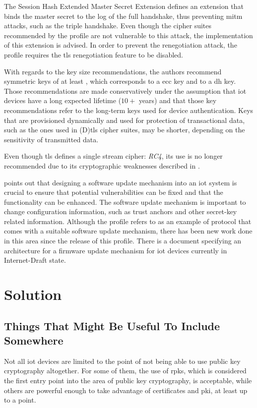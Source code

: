 \documentclass{llncs}
\begin{document}
The Session Hash Extended Master Secret Extension\cite{RFC7627} defines an extension
that binds the master secret to the log of the full handshake, thus preventing
\gls{mitm} attacks, such as the triple handshake\cite{TripleHa89:online}. Even though the
cipher suites recommended by the profile are not vulnerable to this attack, the
implementation of this extension is advised. In order to prevent the renegotiation
attack\cite{RFC5746}, the profile requires the \gls{tls} renegotiation feature
to be disabled.

With regards to the key size recommendations, the authors recommend symmetric keys
of at least , which corresponds to a  \gls{ecc}
key and to a  \gls{dh} key. Those recommendations are made
conservatively under the assumption that \gls{iot} devices have a long expected
lifetime ($10+$ years) and that those key recommendations refer to the long-term
keys used for device authentication. Keys that are provisioned dynamically
and used for protection of transactional data, such as the ones used in
(D)\gls{tls} cipher suites, may be shorter, depending on the sensitivity of
transmitted data.

Even though \gls{tls} defines a single stream cipher: \textit{RC4}, its use is no longer
recommended due to its cryptographic weaknesses described in \cite{RFC7465}.

\cite{RFC7925} points out that designing a software
update mechanism into an \gls{iot} system is crucial to ensure that potential vulnerabilities
can be fixed and that the functionality can be enhanced. The software update mechanism
is important to change configuration information, such as trust anchors and
other secret-key related information. Although the profile refers to \cite{OpenMobi29:online}
as an example of protocol that comes with a suitable software update mechanism,
there has been new work done in this area since the release of this profile.
There is a document specifying an architecture for a firmware update
mechanism for \gls{iot} devices\cite{I-D.moran-suit-architecture} currently in Internet-Draft state.

\section{Solution}

\subsection{Things That Might Be Useful To Include Somewhere}
Not all \gls{iot} devices are limited to the point of not being able to use
public key cryptography altogether. For some of them, the use of \gls{rpk}s, 
which is considered the first entry point into the area of public key
cryptography, is acceptable, while others are powerful enough to take
advantage of certificates and \gls{pki}, at least up to a point.
\end{document}
